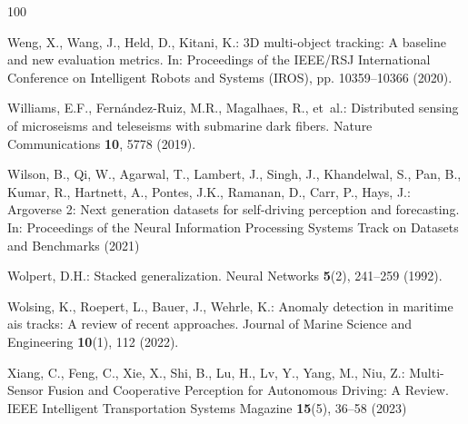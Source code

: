 \documentclass[graybox,envcountchap]{style/SNmono}
\begin{document}
\begin{thebibliography}{100}
{\par}

Weng, X., Wang, J., Held, D., Kitani, K.: {3D} multi-object tracking: A
  baseline and new evaluation metrics.
\newblock In: Proceedings of the IEEE/RSJ International Conference on
  Intelligent Robots and Systems (IROS), pp. 10359--10366 (2020).
\newblock {}



Williams, E.F., Fern{\'a}ndez-Ruiz, M.R., Magalhaes, R., et~al.: Distributed
  sensing of microseisms and teleseisms with submarine dark fibers.
\newblock Nature Communications \textbf{10}, 5778 (2019).
\newblock {}


{\color{red} 
Wilson, B., Qi, W., Agarwal, T., Lambert, J., Singh, J., Khandelwal, S., Pan,
  B., Kumar, R., Hartnett, A., Pontes, J.K., Ramanan, D., Carr, P., Hays, J.:
  Argoverse 2: Next generation datasets for self-driving perception and
  forecasting.
\newblock In: Proceedings of the Neural Information Processing Systems Track on
  Datasets and Benchmarks (2021)

\par}

Wolpert, D.H.: Stacked generalization.
\newblock Neural Networks \textbf{5}(2), 241--259 (1992).
\newblock {}



Wolsing, K., Roepert, L., Bauer, J., Wehrle, K.: Anomaly detection in maritime
  ais tracks: A review of recent approaches.
\newblock Journal of Marine Science and Engineering \textbf{10}(1), 112 (2022).
\newblock {}


{\color{red} 
Xiang, C., Feng, C., Xie, X., Shi, B., Lu, H., Lv, Y., Yang, M., Niu, Z.:
  {Multi-Sensor Fusion and Cooperative Perception for Autonomous Driving: A
  Review}.
\newblock IEEE Intelligent Transportation Systems Magazine \textbf{15}(5),
  36--58 (2023)

}
\end{thebibliography}
\end{document}
